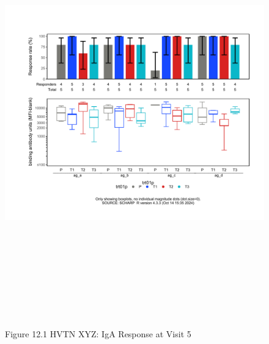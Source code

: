 \documentclass[12pt]{article}
\begin{document}
\begin{figure}[H]

{\centering \includegraphics[width=8.75in,height=7.25in]{test_cases_files/figure-latex/unnamed-chunk-24-1} 

}

\caption[Figure 12.1 boxplot (pos. response boxplots)]{Figure 12.1 HVTN XYZ: IgA Response at Visit 5}\label{fig:unnamed-chunk-24}
\end{figure}
\clearpage
\end{document}
